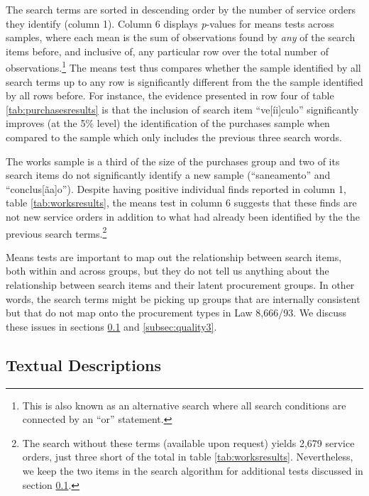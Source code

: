 \documentclass[11pt]{article}
\begin{document}


The search terms are sorted in descending order by the number of service orders they identify (column 1). Column 6 displays \emph{p}-values for means tests across samples, where each mean is the sum of observations found by \emph{any} of the search items before, and inclusive of, any particular row over the total number of observations.\footnote{This is also known as an alternative search where all search conditions are connected by an ``or'' statement.} The means test thus compares whether the sample identified by all search terms up to any row is significantly different from the the sample identified by all rows before. For instance, the evidence presented in row four of table \ref{tab:purchasesresults} is that the inclusion of search item ``ve{[}íi{]}culo'' significantly improves (at the 5\% level) the identification of the purchases sample when compared to the sample which only includes the previous three search words.



The works sample is a third of the size of the purchases group and two of its search items do not significantly identify a new sample (``saneamento'' and ``conclus{[}ãa{]}o''). Despite having positive individual finds reported in column 1, table \ref{tab:worksresults}, the means test in column 6 suggests that these finds are not new service orders in addition to what had already been identified by the the previous search terms.\footnote{The search without these terms (available upon request) yields 2,679 service orders, just three short of the total in table \ref{tab:worksresults}. Nevertheless, we keep the two items in the search algorithm for additional tests discussed in section \ref{subsec:quality2}.}

Means tests are important to map out the relationship between search items, both within and across groups, but they do not tell us anything about the relationship between search items and their latent procurement groups. In other words, the search terms might be picking up groups that are internally consistent but that do not map onto the procurement types in Law 8,666/93. We discuss these issues in sections \ref{subsec:quality2} and \ref{subsec:quality3}.

\subsection{Textual Descriptions}\label{subsec:quality2}
\end{document}
